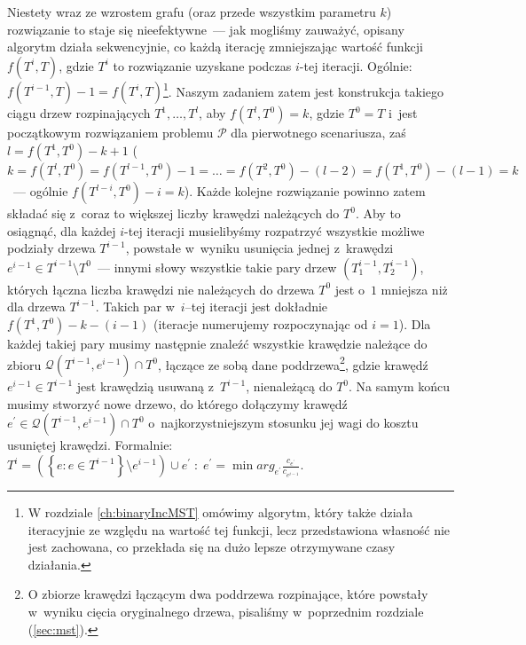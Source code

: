 Niestety wraz ze wzrostem grafu (oraz przede wszystkim parametru $k$) rozwiązanie to staje się nieefektywne~--- jak mogliśmy zauważyć, opisany algorytm działa sekwencyjnie, co każdą iterację zmniejszając wartość funkcji $f \left( T^{i}, T \right)$, gdzie $T^{i}$ to rozwiązanie uzyskane podczas $i$-tej iteracji.
Ogólnie: $f \left( T^{i-1}, T \right) - 1 = f \left( T^{i}, T \right)$\footnote{
	W rozdziale \ref{ch:binaryIncMST} omówimy algorytm, który także działa iteracyjnie ze względu na wartość tej funkcji, lecz przedstawiona własność nie jest zachowana, co przekłada się na dużo lepsze otrzymywane czasy działania.
}.
Naszym zadaniem zatem jest konstrukcja takiego ciągu drzew rozpinających $T^{1}, \dots, T^{l}$, aby $f \left( T^{l}, T^{0} \right) = k$, gdzie $T^{0} = T$ i~jest początkowym rozwiązaniem problemu $\mathcal{P}$ dla pierwotnego scenariusza, zaś $l = f \left( T^{1}, T^{0} \right) - k + 1$ ($k = f \left( T^{l}, T^{0} \right) = f \left( T^{l-1}, T^{0} \right) - 1 = \dots =  f \left( T^{2}, T^{0} \right) - \left( l - 2 \right) = f \left( T^{1}, T^{0} \right) - \left( l - 1 \right) = k$~--- ogólnie $f \left( T^{l - i}, T^{0} \right) - i = k$).
Każde kolejne rozwiązanie powinno zatem składać się z~coraz to większej liczby krawędzi należących do $T^{0}$.
Aby to osiągnąć, dla każdej $i$-tej iteracji musielibyśmy rozpatrzyć wszystkie możliwe podziały drzewa $T^{i-1}$, powstałe w~wyniku usunięcia jednej z~krawędzi $e^{i-1} \in T^{i-1} \setminus T^{0}$~--- innymi słowy wszystkie takie pary drzew $\left( T^{i-1}_{1}, T^{i-1}_{2} \right)$, których łączna liczba krawędzi nie należących do drzewa $T^{0}$ jest o~$1$ mniejsza niż dla drzewa $T^{i-1}$. 
Takich par w~$i$--tej iteracji jest dokładnie $f \left( T^{1}, T^{0} \right) - k - \left( i - 1 \right)$ (iteracje numerujemy rozpoczynając od $i = 1$).
Dla każdej takiej pary musimy następnie znaleźć wszystkie krawędzie należące do zbioru $\mathcal{Q} \left( T^{i-1}, e^{i-1} \right) \cap T^{0}$, łączące ze sobą dane poddrzewa\footnote{
	O zbiorze krawędzi łączącym dwa poddrzewa rozpinające, które powstały w~wyniku cięcia oryginalnego drzewa, pisaliśmy w~poprzednim rozdziale (\ref{sec:mst}).
}, gdzie krawędź $e^{i-1} \in T^{i-1}$ jest krawędzią usuwaną z~$T^{i-1}$, nienależącą do $T^{0}$.
Na samym końcu musimy stworzyć nowe drzewo, do którego dołączymy krawędź $e^{\prime} \in \mathcal{Q} \left( T^{i-1}, e^{i-1} \right) \cap T^{0}$ o~najkorzystniejszym stosunku jej wagi do kosztu usuniętej krawędzi.
Formalnie: $T^{i} = \left( \left\{ e : e \in T^{i-1} \right\} \setminus e^{i-1} \right) \cup e^{\prime} \; : \; e^{\prime} = \min arg_{e^{\prime}} \frac{c_{e^{\prime}}}{c_{e^{i-1}}}$. 


